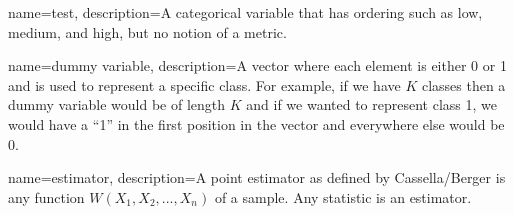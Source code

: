 {
        name={test},
        description={A categorical variable that has ordering such as low, medium, and high, but no notion of a metric.}
}

{
        name={dummy variable},
        description={A vector where each element is either 0 or 1 and is used to represent a specific class. For example, if we have $K$ classes then a dummy variable would be of length $K$ and if we wanted to represent class 1, we would have a ``1'' in the first position in the vector and everywhere else would be 0.}
}

{
        name={estimator},
        description={A point estimator as defined by Cassella/Berger is any function $W(X_1, X_2, ..., X_n)$ of a sample. Any statistic is an estimator.}
}



%
%



